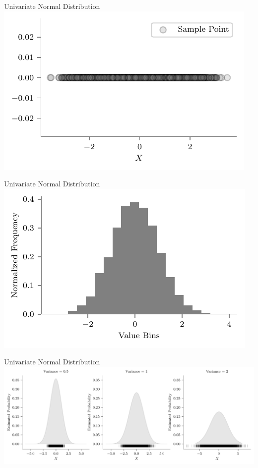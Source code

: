 \documentclass{beamer}
\begin{document}
\begin{frame}{Univariate Normal Distribution}
	\includegraphics[width=\linewidth,height=\textheight,keepaspectratio]{gp/1d-gp} 
\end{frame}

\begin{frame}{Univariate Normal Distribution}
	\includegraphics[width=\linewidth,height=\textheight,keepaspectratio]{gp/1d-gp-hist}
\end{frame}


\begin{frame}{Univariate Normal Distribution}
	\includegraphics[width=\linewidth,height=\textheight,keepaspectratio]{gp/1d-gp-kde2}
\end{frame}
\end{document}
